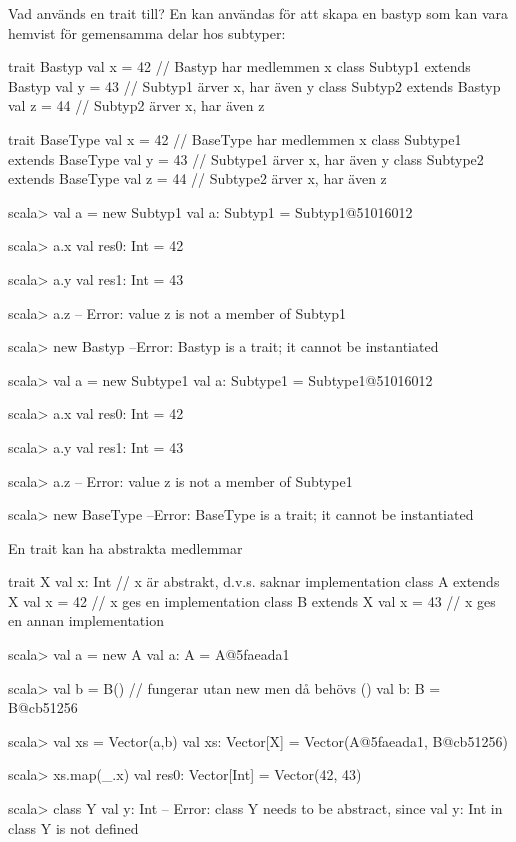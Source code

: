\begin{Slide}{Vad används en trait till?}
En  kan användas för att skapa en bastyp som kan vara hemvist för gemensamma delar hos subtyper:
\ifswedish
\begin{Code}
trait Bastyp { val x = 42 }                 // Bastyp har medlemmen x
class Subtyp1 extends Bastyp { val y = 43 } // Subtyp1 ärver x, har även y
class Subtyp2 extends Bastyp { val z = 44 } // Subtyp2 ärver x, har även z
\end{Code}
\else
\begin{Code}
trait BaseType { val x = 42 }                 // BaseType har medlemmen x
class Subtype1 extends BaseType { val y = 43 } // Subtype1 ärver x, har även y
class Subtype2 extends BaseType { val z = 44 } // Subtype2 ärver x, har även z
\end{Code}
\fi{}
\pause\vspace{-0.5em}
\ifswedish
\begin{REPLsmall}
scala> val a = new Subtyp1
val a: Subtyp1 = Subtyp1@51016012

scala> a.x
val res0: Int = 42

scala> a.y
val res1: Int = 43

scala> a.z
-- Error:
  value z is not a member of Subtyp1

scala> new Bastyp
--Error:
  Bastyp is a trait; it cannot be instantiated
\end{REPLsmall}
\else
\begin{REPLsmall}
scala> val a = new Subtype1
val a: Subtype1 = Subtype1@51016012

scala> a.x
val res0: Int = 42

scala> a.y
val res1: Int = 43

scala> a.z
-- Error:
  value z is not a member of Subtype1

scala> new BaseType
--Error:
  BaseType is a trait; it cannot be instantiated
\end{REPLsmall}
\fi{}

\end{Slide}


\begin{Slide}{En trait kan ha abstrakta medlemmar}
\begin{Code}
trait X { val x: Int }   // x är abstrakt, d.v.s. saknar implementation
class A extends X { val x = 42 }   // x ges en implementation
class B extends X { val x = 43 }   // x ges en annan implementation
\end{Code}
\pause\vspace{-0.5em}
\begin{REPL}
scala> val a = new A
val a: A = A@5faeada1

scala> val b = B()    // fungerar utan new men då behövs ()
val b: B = B@cb51256

scala> val xs = Vector(a,b)
val xs: Vector[X] = Vector(A@5faeada1, B@cb51256)

scala> xs.map(_.x)
val res0: Vector[Int] = Vector(42, 43)

scala> class Y { val y: Int }
-- Error: 
  class Y needs to be abstract, since val y: Int in class Y is not defined
\end{REPL}
\end{Slide}

